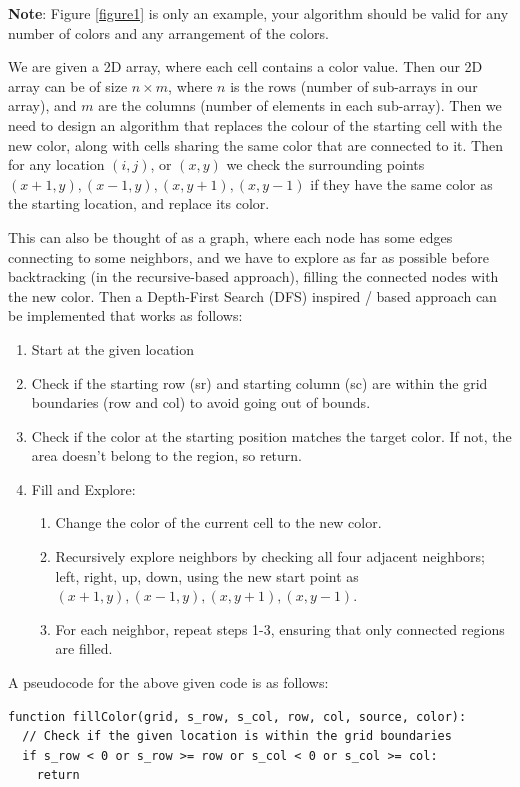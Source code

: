 \documentclass[addpoints]{exam}
\begin{document}
\begin{questions}
  \textbf{Note}: Figure \ref{figure1} is only an example, your algorithm should be valid for any number of colors and any arrangement of the colors.

  \begin{solution}
    We are given a 2D array, where each cell contains a color value. Then our 2D array can be of size $ n \times m $, where $n$ is the rows (number of sub-arrays in our array), and $m$ are the columns (number of elements in each sub-array). Then we need to design an algorithm that replaces the colour of the starting cell with the new color, along with cells sharing the same color that are connected to it. Then for any location $ (i, j) $, or $ (x, y) $ we check the surrounding points $ (x + 1, y), (x - 1, y), (x, y + 1), (x, y - 1) $ if they have the same color as the starting location, and replace its color.

    This can also be thought of as a graph, where each node has some edges connecting to some neighbors, and we have to explore as far as possible before backtracking (in the recursive-based approach), filling the connected nodes with the new color. Then a Depth-First Search (DFS) inspired / based approach can be implemented that works as follows:
    \begin{enumerate}
      \item Start at the given location
      \item Check if the starting row (sr) and starting column (sc) are within the grid boundaries (row and col) to avoid going out of bounds.
      \item Check if the color at the starting position matches the target color. If not, the area doesn't belong to the region, so return.
      \item Fill and Explore: \begin{enumerate}
              \item Change the color of the current cell to the new color.
              \item Recursively explore neighbors by checking all four adjacent neighbors; left, right, up, down, using the new start point as $ (x + 1, y), (x - 1, y), (x, y + 1), (x, y - 1) $.
              \item For each neighbor, repeat steps 1-3, ensuring that only connected regions are filled.
            \end{enumerate}
    \end{enumerate}

    A pseudocode for the above given code is as follows:
    \begin{verbatim}
function fillColor(grid, s_row, s_col, row, col, source, color):
  // Check if the given location is within the grid boundaries
  if s_row < 0 or s_row >= row or s_col < 0 or s_col >= col:
    return
  

\end{verbatim}
\end{solution}
\end{questions}
\end{document}
